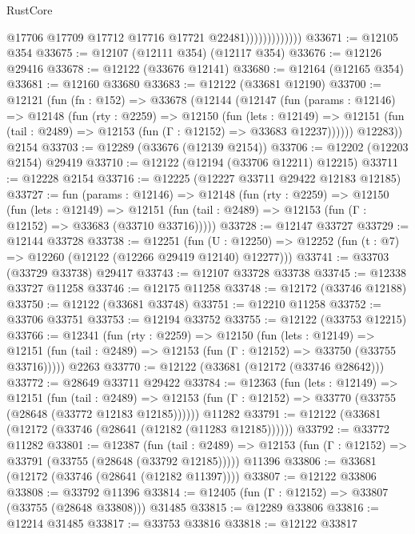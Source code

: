 \begin{lexlean}{RustCore}
\begin{coremodule}
                              @17706
                              @17709
                              @17712
                              @17716
                              @17721
                              @22481)))))))))))))
@33671 := @12105 @354
@33675 := @12107 (@12111 @354) (@12117 @354)
@33676 := @12126 @29416
@33678 := @12122 (@33676 @12141)
@33680 := @12164 (@12165 @354)
@33681 := @12160 @33680
@33683 := @12122 (@33681 @12190)
@33700 := @12121
    (fun (fn : @152) =>
    @33678
      (@12144
        (@12147
          (fun (params : @12146) =>
          @12148
            (fun (rty : @2259) =>
            @12150
              (fun (lets : @12149) =>
              @12151 (fun (tail : @2489) => @12153 (fun (Γ : @12152) => @33683 @12237))))))
        @12283))
    @2154
@33703 := @12289 (@33676 (@12139 @2154))
@33706 := @12202 (@12203 @2154) @29419
@33710 := @12122 (@12194 (@33706 @12211) @12215)
@33711 := @12228 @2154
@33716 := @12225 (@12227 @33711 @29422 @12183 @12185)
@33727 := fun (params : @12146) =>
  @12148
    (fun (rty : @2259) =>
    @12150
      (fun (lets : @12149) =>
      @12151 (fun (tail : @2489) => @12153 (fun (Γ : @12152) => @33683 (@33710 @33716)))))
@33728 := @12147 @33727
@33729 := @12144 @33728
@33738 := @12251
    (fun (U : @12250) => @12252 (fun (t : @7) => @12260 (@12122 (@12266 @29419 @12140) @12277)))
@33741 := @33703 (@33729 @33738) @29417
@33743 := @12107 @33728 @33738
@33745 := @12338 @33727 @11258
@33746 := @12175 @11258
@33748 := @12172 (@33746 @12188)
@33750 := @12122 (@33681 @33748)
@33751 := @12210 @11258
@33752 := @33706 @33751
@33753 := @12194 @33752
@33755 := @12122 (@33753 @12215)
@33766 := @12341
    (fun (rty : @2259) =>
    @12150
      (fun (lets : @12149) =>
      @12151 (fun (tail : @2489) => @12153 (fun (Γ : @12152) => @33750 (@33755 @33716)))))
    @2263
@33770 := @12122 (@33681 (@12172 (@33746 @28642)))
@33772 := @28649 @33711 @29422
@33784 := @12363
    (fun (lets : @12149) =>
    @12151
      (fun (tail : @2489) =>
      @12153 (fun (Γ : @12152) => @33770 (@33755 (@28648 (@33772 @12183 @12185))))))
    @11282
@33791 := @12122 (@33681 (@12172 (@33746 (@28641 (@12182 (@11283 @12185))))))
@33792 := @33772 @11282
@33801 := @12387
    (fun (tail : @2489) => @12153 (fun (Γ : @12152) => @33791 (@33755 (@28648 (@33792 @12185)))))
    @11396
@33806 := @33681 (@12172 (@33746 (@28641 (@12182 @11397))))
@33807 := @12122 @33806
@33808 := @33792 @11396
@33814 := @12405 (fun (Γ : @12152) => @33807 (@33755 (@28648 @33808))) @31485
@33815 := @12289 @33806
@33816 := @12214 @31485
@33817 := @33753 @33816
@33818 := @12122 @33817

\end{coremodule}
\end{lexlean}
